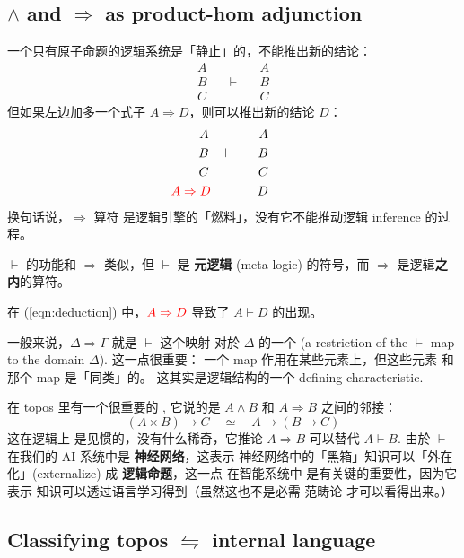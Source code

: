 \subsection{$\wedge$ and $\Rightarrow$ as product-hom adjunction}

一个只有原子命题的逻辑系统是「静止」的，不能推出新的结论： 
\begin{eqnarray}
A & \qquad & A \nonumber \\
B & \quad \vdash \quad & B \\
C & \qquad & C \nonumber
\end{eqnarray}
但如果左边加多一个式子 $A \Rightarrow D$，则可以推出新的结论 $D$：
\begin{eqnarray}
\label{eqn:deduction}
A & \qquad & A \nonumber \\
B & \quad \vdash \quad & B \\
C & \qquad & C \nonumber \\
& \hspace*{-3em} {\color{red}A \Rightarrow D} \qquad & D \nonumber
\end{eqnarray}
换句话说，$\Rightarrow$ 算符 是逻辑引擎的「燃料」，没有它不能推动逻辑 inference 的过程。 

$\vdash$ 的功能和 $\Rightarrow$ 类似，但 $\vdash$ 是 \textbf{元逻辑} (meta-logic) 的符号，而 $\Rightarrow$ 是逻辑\textbf{之内}的算符。

在 (\ref{eqn:deduction}) 中，${\color{red} A \Rightarrow D}$ 导致了 $A \vdash D$ 的出现。

一般来说，$\Delta \Rightarrow \Gamma$ 就是 $\vdash$ 这个映射 对於 $\Delta$ 的一个  (a restriction of the $\vdash$ map to the domain $\Delta$).  这一点很重要： 一个 map 作用在某些元素上，但这些元素 和那个 map 是「同类」的。 这其实是逻辑结构的一个 defining characteristic.

在 topos 里有一个很重要的 ,  它说的是 $A \wedge B$ 和 $A \Rightarrow B$ 之间的邻接：
\begin{equation}
(A \times B) \rightarrow C \quad \simeq \quad A \rightarrow (B \rightarrow C)
\end{equation}
这在逻辑上 是见惯的，没有什么稀奇，它推论 $A \Rightarrow B$ 可以替代 $A \vdash B$.  由於 $\vdash$ 在我们的 AI 系统中是 \textbf{神经网络}，这表示 神经网络中的「黑箱」知识可以「外在化」(externalize) 成 \textbf{逻辑命题}，这一点 在智能系统中 是有关键的重要性，因为它表示 知识可以透过语言学习得到（虽然这也不是必需 范畴论 才可以看得出来。） 

\subsection{Classifying topos $\leftrightharpoons$ internal language}

